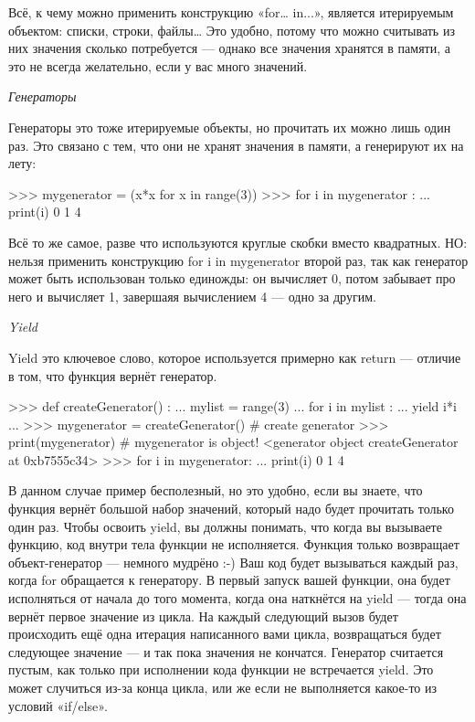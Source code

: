Всё, к чему можно применить конструкцию «for… in...», является итерируемым объектом: списки, строки, файлы… Это удобно, потому что можно считывать из них значения сколько потребуется — однако все значения хранятся в памяти, а это не всегда желательно, если у вас много значений.

\textit{Генераторы}

Генераторы это тоже итерируемые объекты, но прочитать их можно лишь один раз. Это связано с тем, что они не хранят значения в памяти, а генерируют их на лету:

\begin{python}
>>> mygenerator = (x*x for x in range(3))
>>> for i in mygenerator :
...    print(i)
0
1
4
\end{python}

Всё то же самое, разве что используются круглые скобки вместо квадратных. НО: нельзя применить конструкцию for i in mygenerator второй раз, так как генератор может быть использован только единожды: он вычисляет 0, потом забывает про него и вычисляет 1, завершаяя вычислением 4 — одно за другим.

\textit{Yield}

Yield это ключевое слово, которое используется примерно как return — отличие в том, что функция вернёт генератор.

\begin{python}
>>> def createGenerator() :
...    mylist = range(3)
...    for i in mylist :
...        yield i*i
...
>>> mygenerator = createGenerator() # create generator
>>> print(mygenerator) # mygenerator is object!
<generator object createGenerator at 0xb7555c34>
>>> for i in mygenerator:
...     print(i)
0
1
4
\end{python}

В данном случае пример бесполезный, но это удобно, если вы знаете, что функция вернёт большой набор значений, который надо будет прочитать только один раз.
Чтобы освоить yield, вы должны понимать, что когда вы вызываете функцию, код внутри тела функции не исполняется. Функция только возвращает объект-генератор — немного мудрёно :-)
Ваш код будет вызываться каждый раз, когда for обращается к генератору.
В первый запуск вашей функции, она будет исполняться от начала до того момента, когда она наткнётся на yield — тогда она вернёт первое значение из цикла. На каждый следующий вызов будет происходить ещё одна итерация написанного вами цикла, возвращаться будет следующее значение — и так пока значения не кончатся.
Генератор считается пустым, как только при исполнении кода функции не встречается yield. Это может случиться из-за конца цикла, или же если не выполняется какое-то из условий «if/else».

